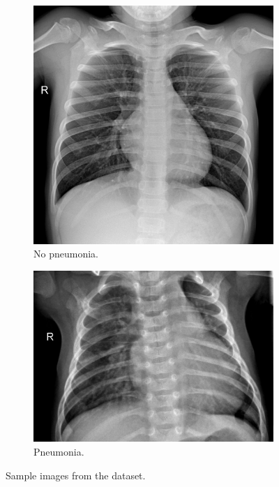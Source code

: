 \documentclass[12pt]{report}
\begin{document}
\begin{figure}[H]
    \centering
    \begin{subfigure}[b]{0.45\textwidth}
        \centering
        \includegraphics[width=\textwidth]{Proposal/SampleNORMAL.jpeg}
        \caption{No pneumonia.\label{fig:SampleNORMAL}}
    \end{subfigure}
    \hfill
    \begin{subfigure}[b]{0.45\textwidth}
        \centering
        \includegraphics[width=\textwidth]{Proposal/SamplePNEUMONIA.jpeg}
        \caption{Pneumonia.\label{fig:SamplePNEUMONIA}}
    \end{subfigure}

    \caption{Sample images from the dataset.}
    \label{fig:SampleImages}
\end{figure}
\end{document}
